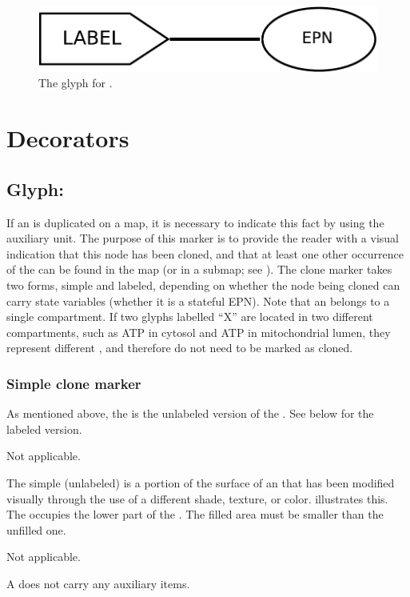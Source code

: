 \begin{figure}[H]
  \centering
  \includegraphics[scale = 0.4]{images/equivalence}
  \caption{The \PD glyph for .}
  \label{fig:equivalence}
\end{figure}

\section{Decorators}

\subsection{Glyph: }
\label{sec:cloneMarker}

If an  is duplicated on a map, it is necessary to indicate this fact by using the  auxiliary unit.  The purpose of this marker is to provide the reader with a visual indication that this node has been cloned, and that at least one other occurrence of the  can be found in the map (or in a submap; see ).  The clone marker takes two forms, simple and labeled, depending on whether the node being cloned can carry state variables (\ie whether it is a stateful EPN). Note that an  belongs to a single compartment. If two glyphs labelled ``X'' are located in two different compartments, such as ATP in cytosol and ATP in mitochondrial lumen, they represent different , and therefore do not need to be marked as cloned.


\subsubsection{Simple clone marker}

As mentioned above, the  is the unlabeled version of the .  See below for the labeled version.


\begin{glyphDescription}

\glyphSboTerm Not applicable.

\glyphContainer The simple (unlabeled)  is a portion of the surface of an  that has been modified visually through the use of a different shade, texture, or color.   illustrates this.  The  occupies the lower part of the . The filled area must be smaller than the unfilled one.

\glyphLabel Not applicable.

\glyphAux A  does not carry any auxiliary items.

\end{glyphDescription}


